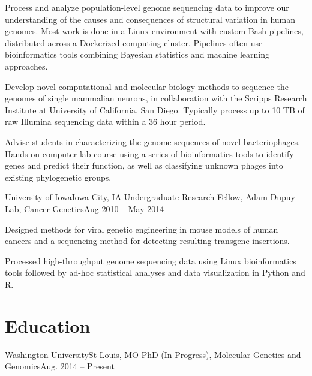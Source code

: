 			{Process and analyze population-level genome sequencing data to improve our understanding of the causes and consequences of structural variation in human genomes. Most work is done in a Linux environment with custom Bash pipelines, distributed across a Dockerized computing cluster. Pipelines often use bioinformatics tools combining Bayesian statistics and machine learning approaches.}
			
			{Develop novel computational and molecular biology methods to sequence the genomes of single mammalian neurons, in collaboration with the Scripps Research Institute at University of California, San Diego. Typically process up to 10 TB of raw Illumina sequencing data within a 36 hour period.}
			
			{Advise students in characterizing the genome sequences of novel bacteriophages. Hands-on computer lab course using a series of bioinformatics tools to identify genes and predict their function, as well as classifying unknown phages into existing phylogenetic groups.}

		\resumeItemListEnd

		\resumeSubheading
		{University of Iowa}{Iowa City, IA}
		{Undergraduate Research Fellow, Adam Dupuy Lab, Cancer Genetics}{Aug 2010 -- May 2014}

		\resumeItemListStart

			{Designed methods for viral genetic engineering in mouse models of human cancers and a sequencing method for detecting resulting transgene insertions.}
			
			{Processed high-throughput genome sequencing data using Linux bioinformatics tools followed by ad-hoc statistical analyses and data visualization in Python and R.}

		\resumeItemListEnd

	\resumeSubHeadingListEnd

\section{Education}
   \resumeSubHeadingListStart
   
      \resumeSubheading
      {Washington University}{St Louis, MO}
      {PhD (In Progress), Molecular Genetics and Genomics}{Aug. 2014 -- Present}
      
